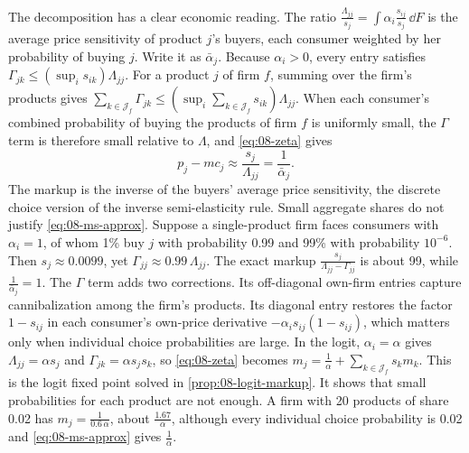 The decomposition has a clear economic reading. The ratio $\frac{\Lambda_{jj}}{s_j} = \int \alpha_i
\frac{s_{ij}}{s_j}\,\dd F$ is the average price sensitivity of product $j$'s buyers, each consumer weighted by her
probability of buying $j$. Write it as $\bar\alpha_j$. Because $\alpha_i > 0$, every entry satisfies $\Gamma_{jk}
\le (\sup_i s_{ik})\Lambda_{jj}$. For a product $j$ of firm $f$, summing over the firm's products gives
$\sum_{k\in\mathcal{J}_f}\Gamma_{jk} \le (\sup_i \sum_{k\in\mathcal{J}_f} s_{ik})\Lambda_{jj}$. When each consumer's
combined probability of buying the products of firm $f$ is uniformly small, the $\Gamma$ term is therefore small
relative to $\Lambda$, and \eqref{eq:08-zeta} gives
\begin{equation}\label{eq:08-ms-approx}
  p_j - mc_j \approx \frac{s_j}{\Lambda_{jj}} = \frac{1}{\bar\alpha_j}.
\end{equation}
The markup is the inverse of the buyers' average price sensitivity, the discrete choice version of the inverse
semi-elasticity rule. Small aggregate shares do not justify \eqref{eq:08-ms-approx}. Suppose a single-product firm
faces consumers with $\alpha_i = 1$, of whom 1\% buy $j$ with probability 0.99 and 99\% with probability $10^{-6}$.
Then $s_j \approx 0.0099$, yet $\Gamma_{jj} \approx 0.99\,\Lambda_{jj}$. The exact markup $\frac{s_j}{\Lambda_{jj} -
\Gamma_{jj}}$ is about 99, while $\frac{1}{\bar\alpha_j} = 1$. The $\Gamma$ term adds two corrections. Its off-diagonal own-firm entries capture cannibalization
among the firm's products. Its diagonal entry restores the factor $1 - s_{ij}$ in each consumer's own-price derivative
$-\alpha_i s_{ij}(1 - s_{ij})$, which matters only when individual choice probabilities are large. In the logit, $\alpha_i = \alpha$ gives $\Lambda_{jj} = \alpha s_j$ and $\Gamma_{jk} = \alpha s_j s_k$,
so \eqref{eq:08-zeta} becomes $m_j = \frac{1}{\alpha} + \sum_{k\in\mathcal{J}_f} s_k m_k$. This is the logit fixed
point solved in \cref{prop:08-logit-markup}. It shows that small probabilities for each product are not enough. A firm
with 20 products of share 0.02 has $m_j = \frac{1}{0.6\,\alpha}$, about $\frac{1.67}{\alpha}$, although every individual
choice probability is 0.02 and \eqref{eq:08-ms-approx} gives $\frac{1}{\alpha}$.

